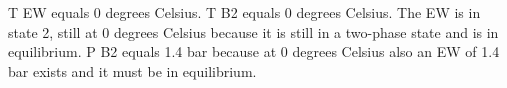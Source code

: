 T EW equals 0 degrees Celsius. T B2 equals 0 degrees Celsius. The EW is in state 2, still at 0 degrees Celsius because it is still in a two-phase state and is in equilibrium. P B2 equals 1.4 bar because at 0 degrees Celsius also an EW of 1.4 bar exists and it must be in equilibrium.